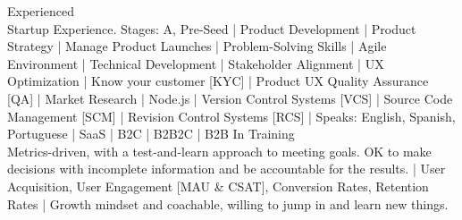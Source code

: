 
Experienced \\
{\scriptsize
Startup Experience. Stages: A, Pre-Seed
| Product Development
| Product Strategy
| Manage Product Launches
| Problem-Solving Skills
| Agile Environment
| Technical Development
| Stakeholder Alignment %
| UX Optimization
| Know your customer [KYC]
| Product UX Quality Assurance [QA]
| Market Research
| Node.js
| Version Control Systems [VCS]
| Source Code Management [SCM]
| Revision Control Systems [RCS]
| Speaks: English, Spanish, Portuguese
| SaaS
| B2C
| B2B2C
| B2B
}
%
In Training \\ %
{\scriptsize
Metrics-driven, with a test-and-learn approach to meeting goals. OK to make decisions with incomplete information and be accountable for the results. |
User Acquisition,
User Engagement [MAU \& CSAT], %
Conversion Rates,
Retention Rates |
Growth mindset and coachable, willing to jump in and learn new things.
}



